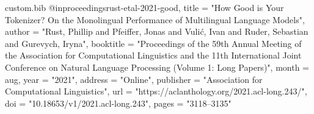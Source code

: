 \begin{filecontents*}[overwrite]{custom.bib}
@inproceedings{rust-etal-2021-good,
    title     = "How Good is Your Tokenizer? On the Monolingual Performance of Multilingual Language Models",
    author    = "Rust, Phillip  and
      Pfeiffer, Jonas  and
      Vuli{\'c}, Ivan  and
      Ruder, Sebastian  and
      Gurevych, Iryna",
    booktitle = "Proceedings of the 59th Annual Meeting of the Association for Computational Linguistics and the 11th International Joint Conference on Natural Language Processing (Volume 1: Long Papers)",
    month     = aug,
    year      = "2021",
    address   = "Online",
    publisher = "Association for Computational Linguistics",
    url       = "https://aclanthology.org/2021.acl-long.243/",
    doi       = "10.18653/v1/2021.acl-long.243",
    pages     = "3118--3135"
}
\end{filecontents*}

\documentclass[11pt]{article}

\usepackage[review]{acl}

\usepackage{times}
\usepackage{latexsym}

\usepackage[T1]{fontenc}

\usepackage[utf8]{inputenc}

\usepackage{microtype}

\usepackage{inconsolata}

\usepackage{graphicx}

\usepackage{booktabs}          %

